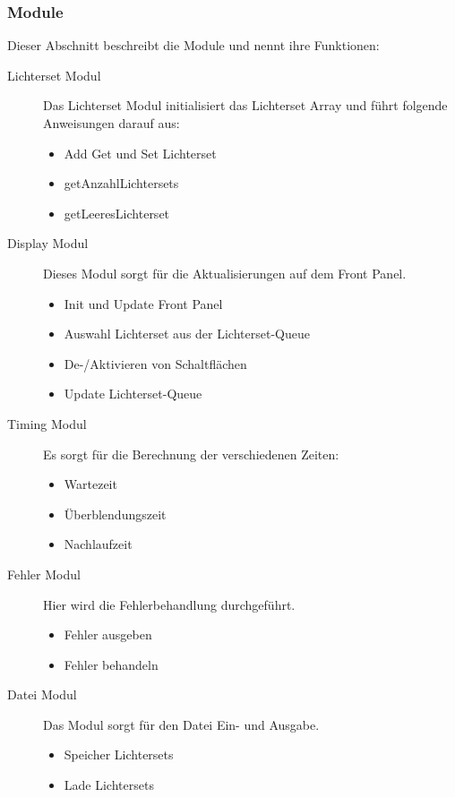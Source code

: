 \subsubsection{Module}
Dieser Abschnitt beschreibt die Module und nennt ihre Funktionen:
\begin{description}
\item[Lichterset Modul]
Das Lichterset Modul initialisiert das Lichterset Array und führt folgende Anweisungen darauf aus:
	\begin{itemize}
	\item Add Get und Set Lichterset
	\item getAnzahlLichtersets
	\item getLeeresLichterset
	\end{itemize}

\item[Display Modul]
Dieses Modul sorgt für die Aktualisierungen auf dem Front Panel.
	\begin{itemize}
	\item Init und Update Front Panel
	\item Auswahl Lichterset aus der Lichterset-Queue
	\item De-/Aktivieren von Schaltflächen
	\item Update  Lichterset-Queue
	\end{itemize}

\item[Timing Modul] Es sorgt für die Berechnung der verschiedenen Zeiten:
	\begin{itemize}
	\item Wartezeit
	\item Überblendungszeit
	\item Nachlaufzeit
	\end{itemize}
\item[Fehler Modul] Hier wird die Fehlerbehandlung durchgeführt.
	\begin{itemize}
	\item Fehler ausgeben
	\item Fehler behandeln
	\end{itemize}

\item[Datei Modul] Das Modul sorgt für den Datei Ein- und Ausgabe.
	\begin{itemize}
	\item Speicher Lichtersets
	\item Lade Lichtersets
	\end{itemize}

\end{description}

